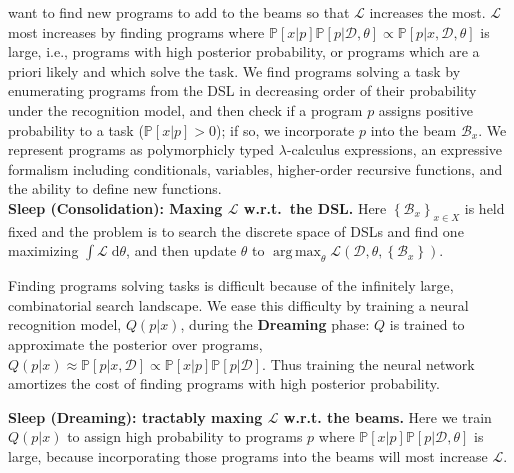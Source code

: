 \documentclass{article}
\newcommand{\lowerBound}{\mathscr{L}}
\DeclareMathOperator*{\argmax}{arg\,max} %
\newcommand{\probability}{\mathds{P}} %
\begin{document}
want to find new programs to add to  the beams so that $\lowerBound$ increases the most.
$\lowerBound$ most increases by finding programs where $\probability[x|p]\probability[p|\mathcal{D},\theta]\propto\probability[p|x,\mathcal{D},\theta]$ 
is large, i.e., programs with high posterior probability,
or programs which are a priori likely and which solve the task.
We find programs solving a task by
enumerating programs
from the DSL in decreasing order of their probability
under the recognition model,
and then check if a program $p$ assigns positive probability to a task
($\probability[x|p] > 0$); if so, we incorporate $p$ into the beam
$\mathcal{B}_x$. We represent programs as polymorphicly typed $\lambda$-calculus expressions,
an expressive formalism
including conditionals,
variables,
higher-order recursive functions,
and the ability to define new functions.
\\\noindent \textbf{Sleep (Consolidation): Maxing $ \lowerBound$ w.r.t.\ the DSL.} Here $\left\{\mathcal{B}_x \right\}_{x\in X}$ is held fixed and the problem is to search the discrete space of DSLs and find one maximizing $\int \lowerBound \;\mathrm{d}\theta$,
and then update $\theta$ to $\argmax_\theta \lowerBound(\mathcal{D},\theta,\left\{\mathcal{B}_x \right\})$.

Finding programs solving tasks is difficult because of the infinitely
large, combinatorial search landscape. We ease this difficulty by
training a neural recognition model, $Q(p |x )$, during the
\textbf{Dreaming} phase: $Q$ is trained to approximate the posterior
over programs, $Q(p|x)\approx
\probability[p|x,\mathcal{D}]\propto\probability[x|p]\probability[p|\mathcal{D}]$.
Thus training the neural network amortizes the cost of finding
programs with high posterior probability.

\noindent\textbf{Sleep (Dreaming): tractably maxing $\lowerBound$ w.r.t. the
  beams.}  Here we train %
$Q(p|x)$ to assign high probability to programs $p$ where
$\probability[x|p]\probability[p|\mathcal{D},\theta]$ is large, because incorporating those programs
into the beams will most increase $\lowerBound$.
\end{document}
